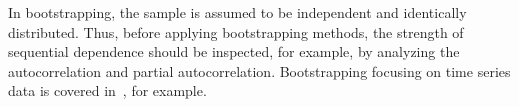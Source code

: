 In bootstrapping, the sample is assumed to be independent and identically distributed.
Thus, before applying bootstrapping methods, the strength of sequential dependence should be inspected, for example, by analyzing the autocorrelation and partial autocorrelation.
Bootstrapping focusing on time series data is covered in~\textcite{Hardle2003,Kreiss2012}, for example.